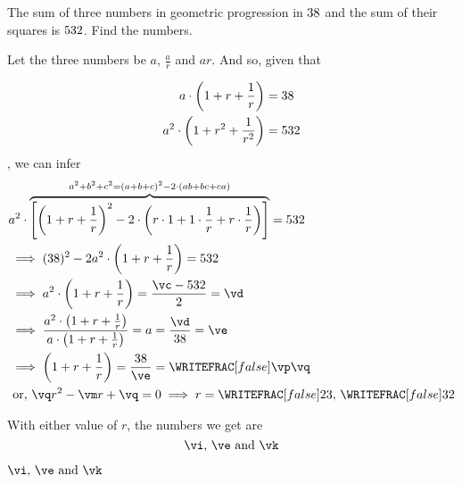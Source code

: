 

\SQUARE\va\vc
\EXPR[0]
\DIVIDE\vd\va\ve

\FRACTIONSIMPLIFY\va\ve\vp\vq
\SUBTRACT\vp\vq\vm

\FRACMULT{}\vx\vy\vi\vj
\FRACDIV{}\vx\vy\vk\vl

\question[4] The sum of three numbers in geometric progression in $38$ and the sum of their
squares is $532$. Find the numbers.

\watchout

\begin{solution}[\fullpage]
	Let the three numbers be $a$, $\frac{a}{r}$ and $ar$. And so, given that
	
	\begin{align}
		a\cdot\left( 1 + r + \frac{1}{r} \right) &= 38 \\
		a^2\cdot\left( 1 + r^2 + \frac{1}{r^2} \right) &= 532
	\end{align}
	, we can infer 
	\begin{align}
		&a^2\cdot\overbrace{\left[ \left( 1 + r + \frac{1}{r} \right)^2 - 
		2\cdot\left( r\cdot1 + 1\cdot\frac{1}{r} + r\cdot\frac{1}{r} \right)\right]}
    ^{a^2+b^2+c^2 = (a+b+c)^2-2\cdot(ab+bc+ca)}= \vb \\
		&\implies (\va)^2 - 2a^2\cdot\left( 1 + r + \frac{1}{r} \right) = \vb \\
		&\implies a^2\cdot\left( 1 + r + \frac{1}{r} \right) = \dfrac{\vc-\vb}{2} = \vd \\
		&\implies \dfrac{a^2\cdot\left( 1 + r + \frac{1}{r} \right)}
		{a\cdot\left( 1 + r + \frac{1}{r} \right)} = a = \dfrac{\vd}{\va} = \ve \\
		&\implies \left( 1 + r + \frac{1}{r} \right) = \dfrac\va\ve = \WRITEFRAC[false]\vp\vq \\
		&\text{ or, } \vq r^2 - \vm r + \vq = 0 \implies r =
    \WRITEFRAC[false]\vx\vy,\, 
    \WRITEFRAC[false]\vy\vx 
	\end{align}

  With either value of $r$, the numbers we get are 
  \[ \vi,\,\ve\text{ and } \vk \]
\end{solution}

\ifprintanswers
  \begin{codex}
    $\vi,\,\ve\text{ and }\vk$
  \end{codex}
\fi
